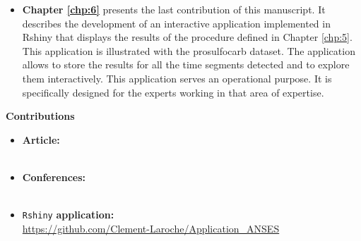 \begin{itemize}
\item{\textbf{Chapter \ref{chp:6}}} presents the last contribution of this manuscript. It describes the development of an interactive application implemented in Rshiny that displays the results of the procedure defined in Chapter \ref{chp:5}. This application is illustrated with the prosulfocarb dataset. The application allows to store the results for all the time segments detected and to explore them interactively. This application serves an operational purpose. It is specifically designed for the experts working in that area of expertise.
\end{itemize}

{\Large\textbf{Contributions}}
\begin{itemize}
\item \textbf{Article:} \\ 
 \\
\item \textbf{Conferences:} \\
 \\
\item \texttt{Rshiny} \textbf{application:} \\
\url{https://github.com/Clement-Laroche/Application_ANSES}
\end{itemize}
